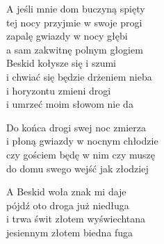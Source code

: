 
\begin{text}
    A jeśli mnie dom buczyną spięty\\
    tej nocy przyjmie w swoje progi\\
    zapalę gwiazdy w nocy głębi\\
    a sam zakwitnę polnym głogiem\\

    Beskid kołysze się i szumi\\
    i chwiać się będzie drżeniem nieba\\
    i horyzontu zmieni drogi\\
    i umrzeć moim słowom nie da

    Do końca drogi swej noc zmierza\\
    i płoną gwiazdy w nocnym chłodzie\\
    czy gościem będę w nim czy muszę\\
    do domu swego wejść jak złodziej

    A Beskid woła znak mi daje\\
    pójdź oto droga już niedługa\\
    i trwa świt złotem wyświechtana\\
    jesiennym złotem biedna fuga
\end{text}
\begin{chord}

\end{chord}